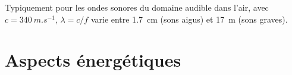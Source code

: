 \documentclass[12pt,fancy]{cours}
\begin{document}

Typiquement pour les ondes sonores du domaine audible dans l'air, avec $c=\SI{340}{m.s^{-1}}$, $\lambda=c/f$ varie entre \SI{1,7}{cm} (sons aigus) et \SI{17}{m} (sons graves).





\section{Aspects énergétiques}
\label{sec:énergie}
\end{document}
